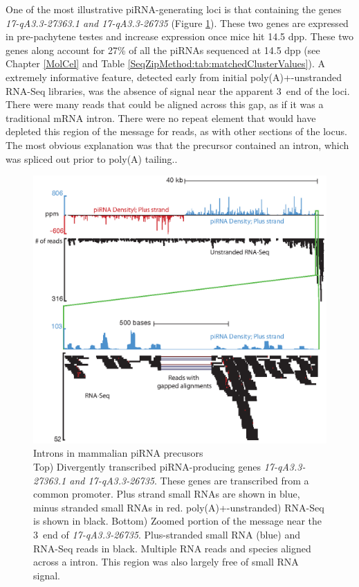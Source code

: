   One of the most illustrative piRNA-generating loci is that containing the genes \textit{17-qA3.3-27363.1 and 17-qA3.3-26735} (Figure \ref{SeqZipMethod:fig:no piRNAs within Precursor Introns}). These two genes are expressed in pre-pachytene testes and increase expression once mice hit 14.5 dpp. These two genes along account for 27\% of all the piRNAs sequenced at 14.5 dpp (see Chapter \ref{MolCel} and Table \ref{SeqZipMethod:tab:matchedClusterValues}). A extremely informative feature, detected early from initial poly(A)+-unstranded RNA-Seq libraries, was the absence of signal near the apparent 3\textprime~end of the loci. There were many reads that could be aligned across this gap, as if it was a traditional mRNA intron. There were no repeat element that would have depleted this region of the message for reads, as with other sections of the locus. The most obvious explanation was that the precursor contained an intron, which was spliced out prior to poly(A) tailing..

  \begin{figure} %
    \centering 
    \includegraphics{Figures/SeqZipMethod/noPiRNAswithinPrecusorIntrons.eps}
    \caption[Introns in mammalian piRNA precusors]
    {
      Introns in mammalian piRNA precusors\\[0.25cm]
      Top) Divergently transcribed piRNA-producing genes \textit{17-qA3.3-27363.1 and 17-qA3.3-26735}. These genes are transcribed from a common promoter. Plus strand small RNAs are shown in blue, minus stranded small RNAs in red. poly(A)+-unstranded) RNA-Seq is shown in black. Bottom) Zoomed portion of the message near the 3\textprime~end of \textit{17-qA3.3-26735}. Plus-stranded small RNA (blue) and RNA-Seq reads in black. Multiple RNA reads and species aligned across a intron. This region was also largely free of small RNA signal.
      }
    \label{SeqZipMethod:fig:no piRNAs within Precursor Introns}
    \end{figure}

